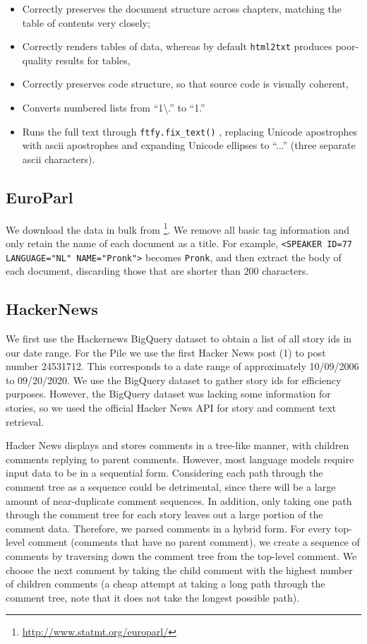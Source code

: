 \documentclass[11pt,a4paper]{article}
\begin{document}
\begin{appendices}
\begin{itemize}
  \item Correctly preserves the document structure across chapters, matching the table of contents very closely;
  \item Correctly renders tables of data, whereas by default \texttt{html2txt} produces poor-quality results for tables,
  \item Correctly preserves code structure, so that source code is visually coherent,
  \item Converts numbered lists from ``1\textbackslash.'' to ``1.''
  \item Runs the full text through {\tt ftfy.fix\_text()} \citep{speer-2019-ftfy}, replacing Unicode apostrophes with ascii apostrophes and expanding Unicode ellipses to ``...'' (three separate ascii characters).
\end{itemize}

\subsection{EuroParl}

We download the data in bulk from \footnote{\url{ http://www.statmt.org/europarl/}}. We remove all basic tag information and only retain the name of each document as a title. For example, {\tt <SPEAKER ID=77 LANGUAGE="NL" NAME="Pronk">} becomes {\tt Pronk}, and then extract the body of each document, discarding those that are shorter than 200 characters.

\subsection{HackerNews}
We first use the Hackernews BigQuery dataset to obtain a list of all story ids in our date range. For the Pile we use the first Hacker News post (1) to post number 24531712. This corresponds to a date range of approximately 10/09/2006 to 09/20/2020. We use the BigQuery dataset to gather story ids for efficiency purposes. However, the BigQuery dataset was lacking some information for stories, so we used the official Hacker News API for story and comment text retrieval. 

Hacker News displays and stores comments in a tree-like manner, with children comments replying to parent comments. However, most language models require input data to be in a sequential form. Considering each path through the comment tree as a sequence could be detrimental, since there will be a large amount of near-duplicate comment sequences. In addition, only taking one path through the comment tree for each story leaves out a large portion of the comment data. Therefore, we parsed comments in a hybrid form. For every top-level comment (comments that have no parent comment), we create a sequence of comments by traversing down the comment tree from the top-level comment. We choose the next comment by taking the child comment with the highest number of children comments (a cheap attempt at taking a long path through the comment tree, note that it does not take the longest possible path).


\end{appendices}
\end{document}
